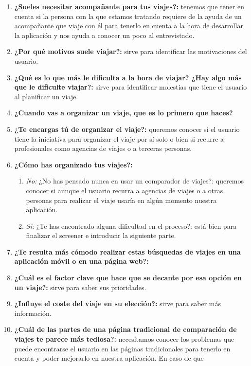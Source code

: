 \begin{enumerate}
    \item {\textbf{¿Sueles necesitar acompañante para tus viajes?:}} tenemos que tener en cuenta si la persona con la que estamos tratando requiere de la
                ayuda de un acompañante que viaje con él para tenerlo en cuenta a la hora de desarrollar la aplicación y nos ayuda a conocer un poco al entrevistado.
    \item {\textbf{¿Por qué motivos suele viajar?:}} sirve para identificar las motivaciones del usuario.
    \item {\textbf{¿Qué es lo que más le dificulta a la hora de viajar? ¿Hay algo más que le dificulte viajar?:}} sirve para identificar molestias que tiene
                el usuario al planificar un viaje.
    \item {\textbf{¿Cuando vas a organizar un viaje, que es lo primero que haces?}}
    \item {\textbf{¿Te encargas tú de organizar el viaje?:}} queremos conocer si el usuario tiene la iniciativa para organizar el viaje por sí solo o bien si
                recurre a profesionales como agencias de viajes o a terceras personas.
    \item{ \textbf{¿Cómo has organizado tus viajes?:}}
    \begin{enumerate}
        \item {\textit{No:}} ¿No has pensado nunca en usar un comparador de viajes?: queremos conocer si aunque el usuario recurra a agencias de viajes o
                        a otras personas para realizar el viaje usaría en algún momento nuestra aplicación.
        \item {\textit{Si:}} ¿Te has encontrado alguna dificultad en el proceso?: está bien para finalizar el screener e introducir la siguiente parte.
    \end{enumerate}
    \item {\textbf{¿Te resulta más cómodo realizar estas búsquedas de viajes en una aplicación móvil o en una página web?:}}
    \item {\textbf{¿Cuál es el factor clave que hace que se decante por esa opción en un viaje?:}} sirve para saber sus prioridades.
    \item {\textbf{¿Influye el coste del viaje en su elección?:}} sirve para saber más información.
    \item {\textbf{¿Cuál de las partes de una página tradicional de comparación de viajes te parece más tediosa?:}} necesitamos conocer los problemas que
                puede encontrarse el usuario en las páginas tradicionales para tenerlo en cuenta y poder mejorarlo en nuestra aplicación. En caso de que

\end{enumerate}
